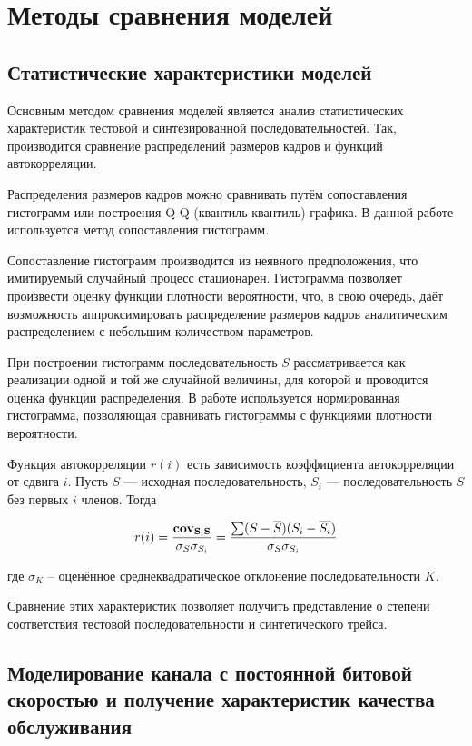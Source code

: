 \section{Методы сравнения моделей}
\label{sec:comparision}

\subsection{Статистические характеристики моделей}
\label{sse:statsmethods}

Основным методом сравнения моделей является анализ
статистических характеристик тестовой и синтезированной
последовательностей. Так, производится сравнение распределений
размеров кадров и функций автокорреляции.

Распределения размеров кадров можно сравнивать путём сопоставления
гистограмм или построения Q-Q (квантиль-квантиль) графика. В данной
работе используется метод сопоставления гистограмм.

Сопоставление гистограмм производится из неявного
предположения, что имитируемый случайный процесс
стационарен. Гистограмма позволяет произвести
оценку функции плотности вероятности, что,
в свою очередь, даёт возможность аппроксимировать
распределение размеров кадров аналитическим
распределением с небольшим количеством параметров.

При построении гистограмм последовательность $S$ рассматривается
как реализации одной и той же случайной величины,
для которой и проводится оценка функции распределения.
В работе используется нормированная гистограмма,
позволяющая сравнивать гистограммы с функциями плотности
вероятности.

Функция автокорреляции $r(i)$ есть зависимость коэффициента
автокорреляции от сдвига $i$. Пусть $S$ --- исходная последовательность,
$S_i$ --- последовательность $S$ без первых $i$ членов. Тогда

\begin{equation}
    r(i) = \frac{\bf{cov}_{S_i S}}{\sigma_S \sigma_{S_i}}
         = \frac{\sum (S - \overline{S})(S_i - \overline{S_i})}{\sigma_S \sigma_{S_i}}
\end{equation}

где $\sigma_K$ -- оценённое среднеквадратическое отклонение последовательности $K$.

Сравнение этих характеристик позволяет получить представление о
степени соответствия тестовой последовательности и
синтетического трейса.

\newpage
\subsection{Моделирование канала с постоянной битовой
скоростью и получение характеристик качества
обслуживания}
\label{sec:modelcomp}

